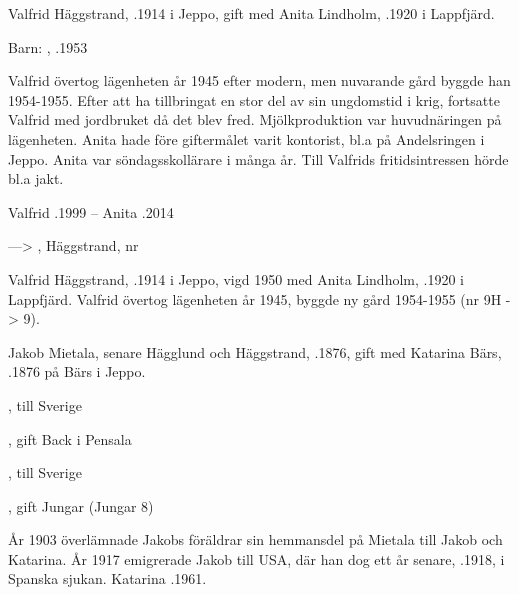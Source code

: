 Valfrid Häggstrand, .1914 i Jeppo, gift med Anita Lindholm, .1920 i Lappfjärd.

Barn: , .1953

Valfrid övertog lägenheten år 1945 efter modern, men nuvarande gård byggde han 1954-1955. Efter att ha tillbringat en stor del av sin ungdomstid i krig, fortsatte Valfrid med jordbruket då det blev fred. Mjölkproduktion var huvudnäringen på lägenheten. Anita hade före giftermålet varit kontorist, bl.a på Andelsringen i Jeppo. Anita var söndagsskollärare i många år. Till Valfrids fritidsintressen hörde bl.a jakt.

Valfrid .1999  --  Anita .2014


---> , Häggstrand, nr 

Valfrid Häggstrand, .1914 i Jeppo, vigd 1950 med Anita Lindholm, .1920 i Lappfjärd. Valfrid övertog lägenheten år 1945, byggde ny gård 1954-1955 (nr 9H -> 9).


Jakob Mietala, senare Hägglund och Häggstrand, .1876, gift med Katarina Bärs, .1876 på Bärs i Jeppo.
\begin{jhchildren}
  \item {}
  \item {}, till Sverige
  \item {}
  \item {}, gift Back i Pensala
  \item {}, till Sverige
  \item {}, gift Jungar (Jungar 8)
  \item {}
  \item {}
\end{jhchildren}
År 1903 överlämnade Jakobs föräldrar sin hemmansdel på Mietala till Jakob och Katarina. År 1917 emigrerade Jakob till USA, där han dog ett år senare, .1918, i Spanska sjukan. Katarina .1961.


